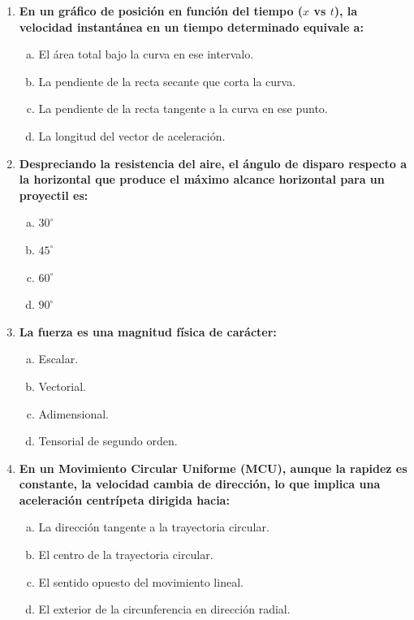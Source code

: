 \documentclass[11pt,a4paper]{article}
\begin{document}
\begin{enumerate}
    \item \textbf{En un gráfico de posición en función del tiempo ($x$ vs $t$), la velocidad instantánea en un tiempo determinado equivale a:}
    \begin{enumerate}[a)]
        \item El área total bajo la curva en ese intervalo.
        \item La pendiente de la recta secante que corta la curva.
        \item La pendiente de la recta tangente a la curva en ese punto.
        \item La longitud del vector de aceleración.
    \end{enumerate}

    \item \textbf{Despreciando la resistencia del aire, el ángulo de disparo respecto a la horizontal que produce el máximo alcance horizontal para un proyectil es:}
    \begin{enumerate}[a)]
        \item $30^\circ$
        \item $45^\circ$
        \item $60^\circ$
        \item $90^\circ$
    \end{enumerate}

    \item \textbf{La fuerza es una magnitud física de carácter:}
    \begin{enumerate}[a)]
        \item Escalar.
        \item Vectorial.
        \item Adimensional.
        \item Tensorial de segundo orden.
    \end{enumerate}

    \item \textbf{En un Movimiento Circular Uniforme (MCU), aunque la rapidez es constante, la velocidad cambia de dirección, lo que implica una aceleración centrípeta dirigida hacia:}
    \begin{enumerate}[a)]
        \item La dirección tangente a la trayectoria circular.
        \item El centro de la trayectoria circular.
        \item El sentido opuesto del movimiento lineal.
        \item El exterior de la circunferencia en dirección radial.
    \end{enumerate}

\end{enumerate}
\end{document}

